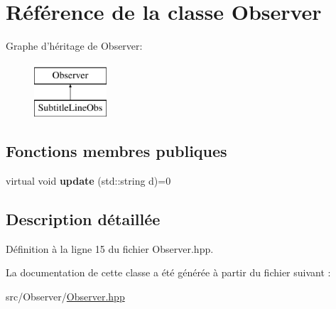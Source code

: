 \hypertarget{classObserver}{\section{Référence de la classe Observer}
\label{classObserver}
}
Graphe d'héritage de Observer\+:\begin{figure}[H]
\begin{center}
\leavevmode
\includegraphics[height=2.000000cm]{classObserver}
\end{center}
\end{figure}
\subsection*{Fonctions membres publiques}
\begin{DoxyCompactItemize}
\item 
\hypertarget{classObserver_a62bb58b07e0b61972acdf7c1d51de98d}{virtual void {\bfseries update} (std\+::string d)=0}\label{classObserver_a62bb58b07e0b61972acdf7c1d51de98d}

\end{DoxyCompactItemize}


\subsection{Description détaillée}


Définition à la ligne 15 du fichier Observer.\+hpp.



La documentation de cette classe a été générée à partir du fichier suivant \+:\begin{DoxyCompactItemize}
\item 
src/\+Observer/\hyperlink{Observer_8hpp}{Observer.\+hpp}\end{DoxyCompactItemize}
